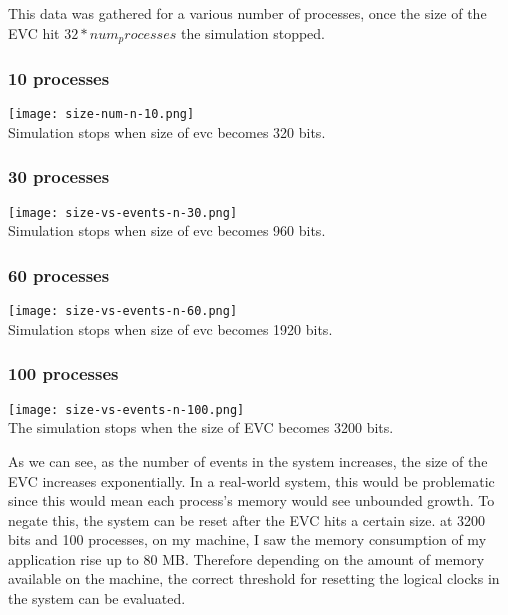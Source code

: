 \documentclass[]{article}
\begin{document}
This data was gathered for a various number of processes, once the size
of the EVC hit \(32 * num_processes\) the simulation stopped.

\hypertarget{processes}{%
\subsubsection{10 processes}\label{processes}}

\texttt{[image: size-num-n-10.png]}\\
Simulation stops when size of evc becomes 320 bits.

\hypertarget{processes-1}{%
\subsubsection{30 processes}\label{processes-1}}

\texttt{[image: size-vs-events-n-30.png]}\\
Simulation stops when size of evc becomes 960 bits.

\hypertarget{processes-2}{%
\subsubsection{60 processes}\label{processes-2}}

\texttt{[image: size-vs-events-n-60.png]}\\
Simulation stops when size of evc becomes 1920 bits.

\hypertarget{processes-3}{%
\subsubsection{100 processes}\label{processes-3}}

\texttt{[image: size-vs-events-n-100.png]}\\
The simulation stops when the size of EVC becomes 3200 bits.

As we can see, as the number of events in the system increases, the size
of the EVC increases exponentially. In a real-world system, this would
be problematic since this would mean each process's memory would see
unbounded growth. To negate this, the system can be reset after the EVC
hits a certain size. at 3200 bits and 100 processes, on my machine, I
saw the memory consumption of my application rise up to 80 MB. Therefore
depending on the amount of memory available on the machine, the correct
threshold for resetting the logical clocks in the system can be
evaluated.
\end{document}

